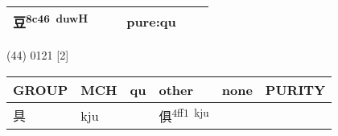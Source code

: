 \documentclass[14pt,a4paper]{scrartcl}
\begin{document}
\begin{longtable}[c]{@{}llllll@{}}
\begin{minipage}[t]{0.14\columnwidth}\raggedright\strut
豆\textsuperscript{8c46~duwH}
\strut\end{minipage} &
\begin{minipage}[t]{0.14\columnwidth}\raggedright\strut
\strut\end{minipage} &
\begin{minipage}[t]{0.14\columnwidth}\raggedright\strut
\strut\end{minipage} &
\begin{minipage}[t]{0.14\columnwidth}\raggedright\strut
pure:qu
\strut\end{minipage}\tabularnewline
\bottomrule
\end{longtable}

(44) 0121 {[}2{]}

\begin{longtable}[c]{@{}llllll@{}}
\toprule
\begin{minipage}[b]{0.14\columnwidth}\raggedright\strut
GROUP
\strut\end{minipage} &
\begin{minipage}[b]{0.14\columnwidth}\raggedright\strut
MCH
\strut\end{minipage} &
\begin{minipage}[b]{0.14\columnwidth}\raggedright\strut
qu
\strut\end{minipage} &
\begin{minipage}[b]{0.14\columnwidth}\raggedright\strut
other
\strut\end{minipage} &
\begin{minipage}[b]{0.14\columnwidth}\raggedright\strut
none
\strut\end{minipage} &
\begin{minipage}[b]{0.14\columnwidth}\raggedright\strut
PURITY
\strut\end{minipage}\tabularnewline
\midrule
\endhead
\begin{minipage}[t]{0.14\columnwidth}\raggedright\strut
具
\strut\end{minipage} &
\begin{minipage}[t]{0.14\columnwidth}\raggedright\strut
kju
\strut\end{minipage} &
\begin{minipage}[t]{0.14\columnwidth}\raggedright\strut
\strut\end{minipage} &
\begin{minipage}[t]{0.14\columnwidth}\raggedright\strut
俱\textsuperscript{4ff1~kju}
\strut\end{minipage} &

\end{longtable}
\end{document}
